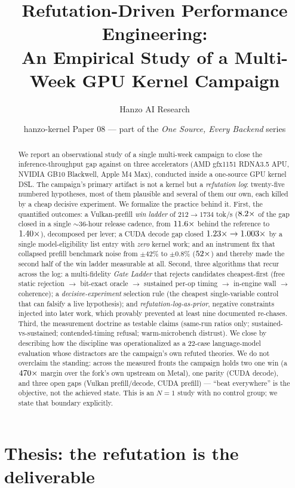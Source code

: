 \documentclass[11pt]{article}
\title{\textbf{Refutation-Driven Performance Engineering:\\
An Empirical Study of a Multi-Week GPU Kernel Campaign}}
\author{Hanzo AI Research}
\date{hanzo-kernel Paper 08 --- part of the \emph{One Source, Every Backend} series}
\begin{document}
\maketitle

\begin{abstract}
We report an observational study of a single multi-week campaign to close the inference-throughput gap
against  on three accelerators (AMD gfx1151 RDNA3.5 APU, NVIDIA GB10 Blackwell, Apple M4
Max), conducted inside a one-source GPU kernel DSL. The campaign's primary artifact is not a kernel but a
\emph{refutation log}: twenty-five numbered hypotheses, most of them plausible and several of them
our own, each killed by a cheap decisive experiment. We formalize the practice behind it. First, the
quantified outcomes: a Vulkan-prefill \emph{win ladder} of $212\to1734$ tok/s ($8.2\times$ of the gap closed in
a single $\sim$36-hour release cadence, from $11.6\times$ behind the reference to $1.40\times$), decomposed per
lever; a CUDA decode gap closed $1.23\times\to1.003\times$ by a single model-eligibility list entry with
\emph{zero} kernel work; and an instrument fix that collapsed
prefill benchmark noise from $\pm42\%$ to $\pm0.8\%$ ($52\times$) and thereby made the second half of the win
ladder measurable at all. Second, three algorithms that recur across the log: a multi-fidelity
\emph{Gate Ladder} that rejects candidates cheapest-first (free static rejection $\to$ bit-exact oracle
$\to$ sustained per-op timing $\to$ in-engine wall $\to$ coherence); a \emph{decisive-experiment}
selection rule (the cheapest single-variable control that can falsify a live hypothesis); and
\emph{refutation-log-as-prior}, negative constraints injected into later work, which provably prevented at
least nine documented re-chases. Third, the measurement doctrine as testable claims (same-run ratios only;
sustained-vs-sustained; contended-timing refusal; warm-microbench distrust). We close by describing how the
discipline was operationalized as a 22-case language-model evaluation whose distractors are the campaign's
own refuted theories. We do not overclaim the standing: across the measured fronts the campaign holds two
one win (a $470\times$ margin over the fork's own upstream on Metal), one parity (CUDA decode),
and three open gaps (Vulkan prefill/decode, CUDA prefill) --- ``beat everywhere'' is the objective, not the
achieved state. This is an $N{=}1$ study with no control group; we state that boundary explicitly.
\end{abstract}

\section{Thesis: the refutation is the deliverable}
\label{sec:thesis}
\end{document}
